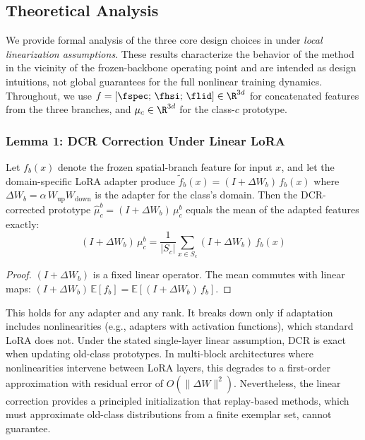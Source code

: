 
\subsection{Theoretical Analysis}
\label{app:theory}

We provide formal analysis of the three core design choices in \methodname{} under \emph{local linearization assumptions}.
These results characterize the behavior of the method in the vicinity of the frozen-backbone operating point and are intended as design intuitions, not global guarantees for the full nonlinear training dynamics.
Throughout, we use $f = [\fspec;\, \fhsi;\, \flid] \in \R^{3d}$ for concatenated features from the three branches, and $\mu_c \in \R^{3d}$ for the class-$c$ prototype.

\subsubsection{Lemma 1: DCR Correction Under Linear LoRA}
\label{app:dcr_exact}

\begin{lemma}
Let $f_b(x)$ denote the frozen spatial-branch feature for input $x$, and let the domain-specific LoRA adapter produce $\tilde{f}_b(x) = (I + \Delta W_b)\, f_b(x)$ where $\Delta W_b = \alpha\, W_{\mathrm{up}} W_{\mathrm{down}}$ is the adapter for the class's domain.
Then the DCR-corrected prototype $\hat{\mu}_c^b = (I + \Delta W_b)\,\mu_c^b$ equals the mean of the adapted features exactly:
\begin{equation}
    (I + \Delta W_b)\,\mu_c^b = \frac{1}{|S_c|}\sum_{x \in S_c} (I + \Delta W_b)\,f_b(x)
\end{equation}
\end{lemma}
\begin{proof}
$(I + \Delta W_b)$ is a fixed linear operator. The mean commutes with linear maps: $(I + \Delta W_b)\,\mathbb{E}[f_b] = \mathbb{E}[(I + \Delta W_b)\,f_b]$.
\end{proof}

This holds for any adapter and any rank.
It breaks down only if adaptation includes nonlinearities (e.g., adapters with activation functions), which standard LoRA does not.
Under the stated single-layer linear assumption, DCR is exact when updating old-class prototypes.
In multi-block architectures where nonlinearities intervene between LoRA layers, this degrades to a first-order approximation with residual error of $O(\|\Delta W\|^2)$.
Nevertheless, the linear correction provides a principled initialization that replay-based methods, which must approximate old-class distributions from a finite exemplar set, cannot guarantee.

